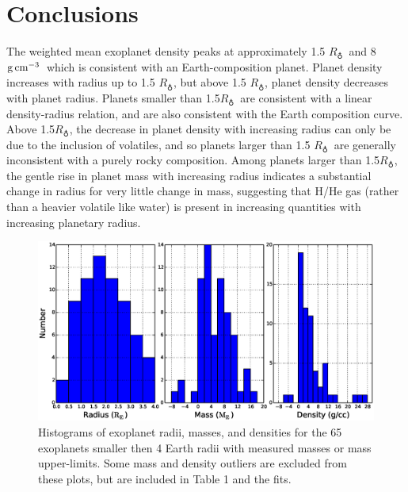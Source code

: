 \documentclass[iop]{emulateapj}
\newcommand{\gcmc}{\ensuremath{\rm g\,cm^{-3}}}
\newcommand{\gcc}{\gcmc}
\newcommand{\rearth}{\ensuremath{R_\earth}}
\begin{document}
\section{Conclusions}
The weighted mean exoplanet density peaks at approximately 1.5 \rearth\ and 8 \gcc\, which is consistent with an Earth-composition planet.  Planet density increases with radius up to 1.5 \rearth, but above 1.5 \rearth, planet density decreases with planet radius. Planets smaller than 1.5\rearth\ are consistent with a linear density-radius relation, and are also consistent with the \citet{Seager2007} Earth composition curve.  Above 1.5\rearth, the decrease in planet density with increasing radius can only be due to the inclusion of volatiles, and so planets larger than 1.5 \rearth\ are generally inconsistent with a purely rocky composition.  Among planets larger than 1.5\rearth, the gentle rise in planet mass with increasing radius indicates a substantial change in radius for very little change in mass, suggesting that H/He gas (rather than a heavier volatile like water) is present in increasing quantities with increasing planetary radius.





\begin{figure}[htbp] %
   \centering
   \includegraphics[width=7in]{histograms.eps} 
   \caption{\small Histograms of exoplanet radii, masses, and densities for the 65 exoplanets smaller then 4 Earth radii with measured masses or mass upper-limits.  Some mass and density outliers are excluded from these plots, but are included in Table 1 and the fits.}
\label{fig:histograms}
\end{figure}
\end{document}
